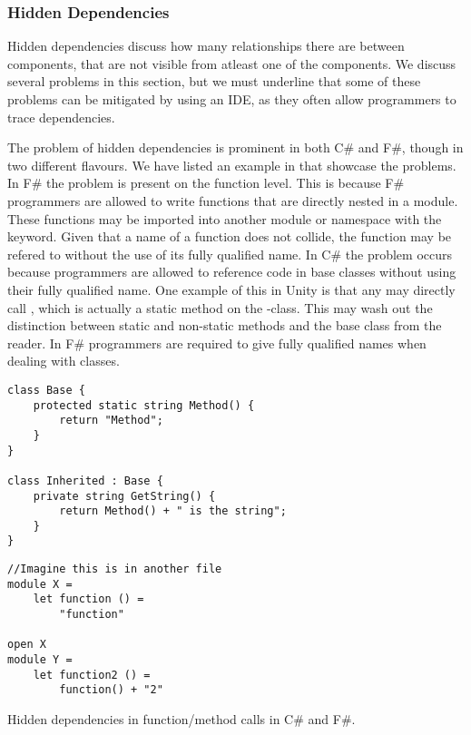 \subsubsection{Hidden Dependencies}
Hidden dependencies discuss how many relationships there are between components, that are not visible from atleast one of the components. We discuss several problems in this section, but we must underline that some of these problems can be mitigated by using an \gls{IDE}, as they often allow programmers to trace dependencies.

The problem of hidden dependencies is prominent in both C\# and F\#, though in two different flavours. We have listed an example in  that showcase the problems. In F\# the problem is present on the function level. This is because F\# programmers are allowed to write functions that are directly nested in a module. These functions may be imported into another module or namespace with the  keyword. Given that a name of a function does not collide, the function may be refered to without the use of its fully qualified name. In C\# the problem occurs because programmers are allowed to reference code in base classes without using their fully qualified name. One example of this in Unity is that any  may directly call , which is actually a static method on the -class. This may wash out the distinction between static and non-static methods and  the base class from the reader. In F\# programmers are required to give fully qualified names when dealing with classes.

\begin{listing}[H]
    \begin{minipage}{.50\textwidth}
        \begin{verbatim}
class Base {
    protected static string Method() {
        return "Method";
    }
}

class Inherited : Base {
    private string GetString() {
        return Method() + " is the string";
    }
}
        \end{verbatim}
    \end{minipage}
    \hfill
    \begin{minipage}{.40\textwidth}
        \begin{verbatim}
//Imagine this is in another file
module X =
    let function () =
        "function"

open X
module Y =
    let function2 () =
        function() + "2"
        \end{verbatim}
    \end{minipage}
\caption{Hidden dependencies in function/method calls in C\# and F\#.}
\label{lst:hidden:dependencies}
\end{listing}

